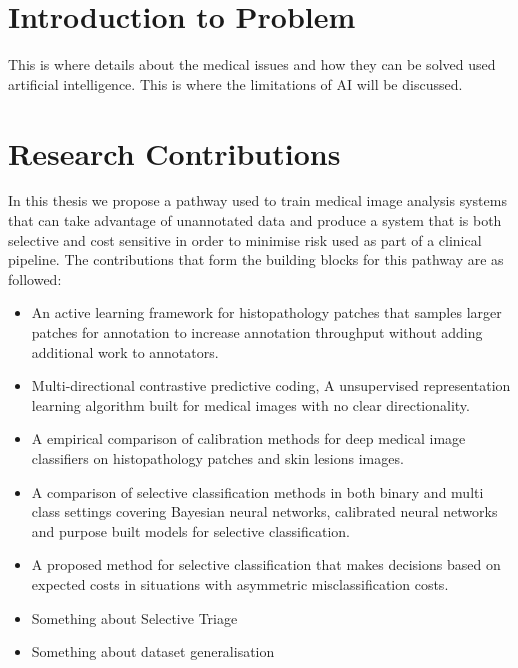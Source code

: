\section{Introduction to Problem}
\label{sec:intoduction_to_problem}
This is where details about the medical issues and how they can be solved used artificial intelligence. This is where the limitations of AI will be discussed.



\section{Research Contributions}
\label{sec:research_contributions}

In this thesis we propose a pathway used to train medical image analysis systems that can take advantage of unannotated data and produce a system that is both selective and cost sensitive in order to minimise risk used as part of a clinical pipeline. The contributions that form the building blocks for this pathway are as followed:

\begin{itemize}
	\item An active learning framework for histopathology patches that samples larger patches for annotation to increase annotation throughput without adding additional work to annotators.
	
	\item Multi-directional contrastive predictive coding, A unsupervised representation learning algorithm built for medical images with no clear directionality.

	\item A empirical comparison of calibration methods for deep medical image classifiers on histopathology patches and skin lesions images.
	
	\item A comparison of selective classification methods in both binary and multi class settings covering Bayesian neural networks, calibrated neural networks and purpose built models for selective classification.
	
	\item A proposed method for selective classification that makes decisions based on expected costs in situations with asymmetric misclassification costs.
	
	\item Something about Selective Triage
	
	\item Something about dataset generalisation
\end{itemize}



